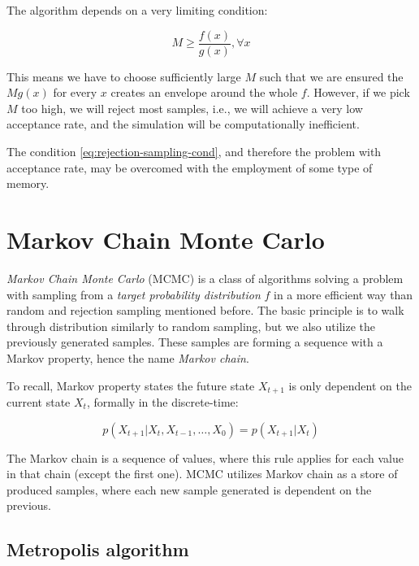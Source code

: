 \documentclass[
  digital, %
  oneside, %
  lof,     %
  lot,     %
]{fithesis4}
\begin{document}
The algorithm depends on a very limiting condition:

\begin{equation}\label{eq:rejection-sampling-cond}
  M \geq \frac{f(x)}{g(x)}, \forall x
\end{equation}

This means we have to choose sufficiently large $M$ such that we are ensured the $M g(x)$ for every $x$ creates an envelope around the whole $f$.
However, if we pick $M$ too high, we will reject most samples, i.e., we will achieve a very low acceptance rate, and the simulation will be computationally inefficient.

The condition \eqref{eq:rejection-sampling-cond}, and therefore the problem with acceptance rate, may be overcomed with the employment of some type of memory.


\section{Markov Chain Monte Carlo}

\textit{Markov Chain Monte Carlo} (MCMC) is a class of algorithms solving a problem with sampling from a \textit{target probability distribution} $f$ in a more efficient way than random and rejection sampling mentioned before.
The basic principle is to walk through distribution similarly to random sampling, but we also utilize the previously generated samples.
These samples are forming a sequence with a Markov property, hence the name \textit{Markov chain}.

To recall, Markov property states the future state $X_{t+1}$ is only dependent on the current state $X_t$, formally in the discrete-time:

\begin{equation}
  p(X_{t+1} | X_t, X_{t - 1}, \dots, X_0) = p(X_{t+1} | X_t)
\end{equation}

The Markov chain is a sequence of values, where this rule applies for each value in that chain (except the first one).
MCMC utilizes Markov chain as a store of produced samples, where each new sample generated is dependent on the previous.


\subsection{Metropolis algorithm}
\end{document}
